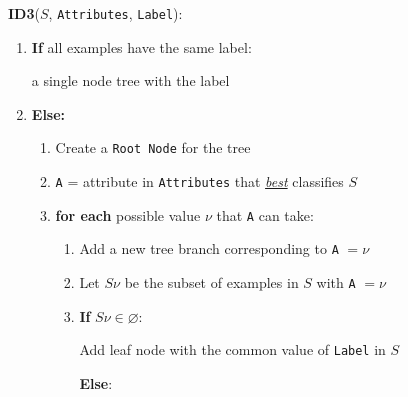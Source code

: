 \documentclass{article}
\begin{document}
\begin{itemize}
\begin{itemize}
	{\bf ID3}($S$, {\tt Attributes}, {\tt Label}):

		\begin{enumerate}
		\item {\bf If} all examples have the same label:
		
		\hspace{2em}{\bf Return} a single node tree with the label
		\item {\bf Else:}
			\begin{enumerate}
			\item Create a \verb~Root Node~ for the tree
			\item \verb~A~ = attribute in \verb~Attributes~ that {\em \underline{best}} classifies $S$
			\item {\bf for each} possible value $\nu$ that \verb~A~ can take:
				\begin{enumerate}
				\item Add a new tree branch corresponding to \verb~A~ $=\nu$
				\item Let $S\nu$ be the subset of examples in $S$ with \verb~A~ $ =\nu$
				\item {\bf If} $S\nu\in\varnothing$:
				
				\hspace{1em}Add leaf node with the common value of \verb~Label~ in $S$
	
				{\bf Else}:


\end{enumerate}
\end{enumerate}
\end{enumerate}
\end{itemize}
\end{itemize}
\end{document}
